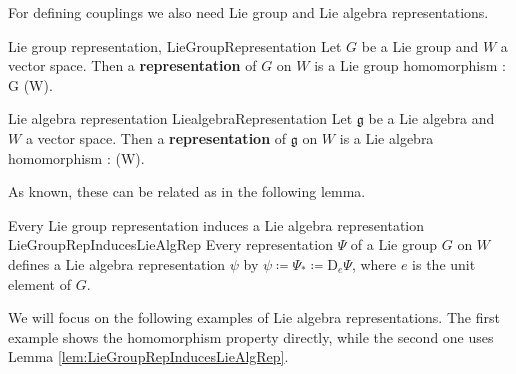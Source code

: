 For defining couplings we also need Lie group and Lie algebra representations.

\begin{definitions}{Lie group representation, \cite[Definition 2.1.1; page 84]{hamilton}}{LieGroupRepresentation}
Let $G$ be a Lie group and $W$ a vector space. Then a \textbf{representation} of $G$ on $W$ is a Lie group homomorphism
\bas
\Psi: G \to {}(W).
\eas
\end{definitions}

\begin{definitions}{Lie algebra representation \cite[Definition 2.1.5; page 85]{hamilton}}{LiealgebraRepresentation}
Let $\mathfrak{g}$ be a Lie algebra and $W$ a vector space. Then a \textbf{representation} of $\mathfrak{g}$ on $W$ is a Lie algebra homomorphism
\bas
\psi:  \to {}(W).
\eas
\end{definitions}

As known, these can be related as in the following lemma.

\begin{lemmata}{Every Lie group representation induces a Lie algebra representation \cite[Proposition 2.1.12; page 86]{hamilton}}{LieGroupRepInducesLieAlgRep}
Every representation $\Psi$ of a Lie group $G$ on $W$ defines a Lie algebra representation $\psi$ by $\psi \coloneqq \Psi_* \coloneqq \mathrm{D}_e \Psi$, where $e$ is the unit element of $G$.
\end{lemmata}

We will focus on the following examples of Lie algebra representations. The first example shows the homomorphism property directly, while the second one uses Lemma \ref{lem:LieGroupRepInducesLieAlgRep}.

